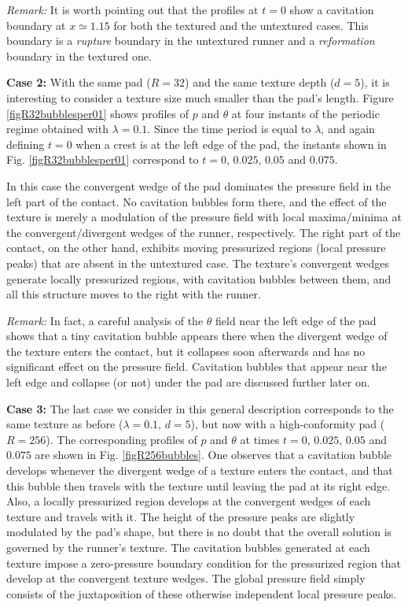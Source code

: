 {\em Remark:} It is worth pointing out that the profiles at $t=0$ 
show a cavitation boundary at $x \simeq 1.15$ for both the textured
and the untextured cases. This boundary is a {\em rupture} boundary
in the untextured runner and a {\em reformation} boundary
in the textured one.

{\bf Case 2:} With the same pad ($R=32$) and the same texture depth ($d=5$), it is
interesting to consider a texture size much smaller than the pad's length.
Figure \ref{figR32bubblesper01} shows profiles of $p$ and $\theta$ at
four instants of the periodic regime obtained with $\lambda = 0.1$.
Since the time period is equal to $\lambda$, and again defining $t=0$
when a crest is at the left edge of the pad, the instants shown in 
Fig.  \ref{figR32bubblesper01} correspond to $t=0$, $0.025$, $0.05$
and $0.075$. 

In this case the convergent wedge of the pad dominates the pressure
field in the left part of the contact. No cavitation bubbles form
there, and the effect of the texture is merely a modulation of the
pressure field with local maxima/minima at the convergent/divergent
wedges of the runner, respectively. The right part of the contact,
on the other hand, exhibits moving pressurized regions (local
pressure peaks) that are
absent in the untextured case. The texture's convergent wedges generate
locally pressurized regions, with cavitation bubbles between them, and
all this structure moves to the right with the runner. 

{\em Remark:} In fact, a careful analysis of the $\theta$ field
near the left edge of the pad shows that a tiny cavitation bubble
appears there when the divergent wedge of the texture enters the
contact, but it collapses soon afterwards and has no significant
effect on the pressure field. Cavitation bubbles that appear near
the left edge and collapse (or not) under the pad are discussed
further later on.

{\bf Case 3:} The last case we consider in this general description corresponds
to the same texture as before ($\lambda = 0.1$, $d=5$), but now
with a high-conformity pad ($R=256$). The corresponding profiles of
$p$ and $\theta$ at times $t=0$, $0.025$, $0.05$ and $0.075$ are shown
in Fig. \ref{figR256bubbles}. One observes that a cavitation bubble
develops whenever the divergent wedge of a texture enters the contact,
and that this bubble then travels with the texture until leaving the
pad at its right edge. Also, a locally pressurized region develops
at the convergent wedges of each texture and travels with it. The
height of the pressure peaks are slightly modulated by the pad's
shape, but there is no doubt that the overall solution is governed
by the runner's texture. The cavitation bubbles generated at each
texture impose a zero-pressure boundary condition for the pressurized
region that develop at the convergent texture wedges. The global pressure
field simply consists of the juxtaposition of these otherwise
independent local pressure peaks.

